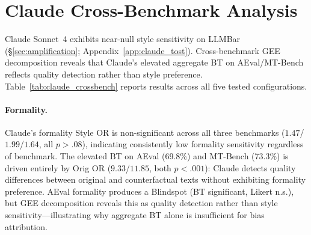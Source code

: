 \section{Claude Cross-Benchmark Analysis}
\label{app:claude_crossbench}

Claude Sonnet~4 exhibits near-null style sensitivity on LLMBar (\S\ref{sec:amplification}; Appendix~\ref{app:claude_tost}).
Cross-benchmark GEE decomposition reveals that Claude's elevated aggregate BT on AEval/MT-Bench reflects quality detection rather than style preference.
Table~\ref{tab:claude_crossbench} reports results across all five tested configurations.

\begin{table}[h]
\centering
\small
\caption{Claude Sonnet~4 cross-benchmark results with GEE decomposition. Formality Style OR is non-significant across all three benchmarks; elevated BT on AEval/MT-Bench is driven by Orig OR (quality detection). AEval verbosity is the sole genuine style effect.}
\label{tab:claude_crossbench}
\end{table}

\paragraph{Formality.}
Claude's formality Style OR is non-significant across all three benchmarks ($1.47$/$1.99$/$1.64$, all $p > .08$), indicating consistently low formality sensitivity regardless of benchmark.
The elevated BT on AEval (69.8\%) and MT-Bench (73.3\%) is driven entirely by Orig OR ($9.33$/$11.85$, both $p < .001$): Claude detects quality differences between original and counterfactual texts without exhibiting formality preference.
AEval formality produces a Blindspot (BT significant, Likert n.s.), but GEE decomposition reveals this as quality detection rather than style sensitivity---illustrating why aggregate BT alone is insufficient for bias attribution.

